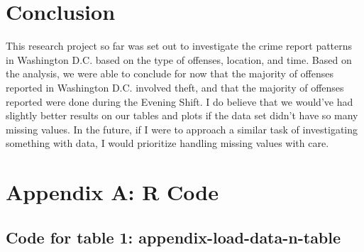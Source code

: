 \documentclass[
]{article}
\newenvironment{Shaded}{}{}
\newcommand{\AttributeTok}[1]{#1}
\newcommand{\CommentTok}[1]{\textcolor[rgb]{0.00,0.50,0.00}{#1}}
\newcommand{\ConstantTok}[1]{#1}
\newcommand{\DecValTok}[1]{#1}
\newcommand{\FunctionTok}[1]{#1}
\newcommand{\NormalTok}[1]{#1}
\newcommand{\OtherTok}[1]{\textcolor[rgb]{1.00,0.25,0.00}{#1}}
\newcommand{\SpecialCharTok}[1]{\textcolor[rgb]{0.00,0.50,0.50}{#1}}
\newcommand{\StringTok}[1]{\textcolor[rgb]{0.00,0.50,0.50}{#1}}
\begin{document}
\section{Conclusion}\label{conclusion}

This research project so far was set out to investigate the crime report
patterns in Washington D.C. based on the type of offenses, location, and
time. Based on the analysis, we were able to conclude for now that the
majority of offenses reported in Washington D.C. involved theft, and
that the majority of offenses reported were done during the Evening
Shift. I do believe that we would've had slightly better results on our
tables and plots if the data set didn't have so many missing values. In
the future, if I were to approach a similar task of investigating
something with data, I would prioritize handling missing values with
care.

\section{Appendix A: R Code}\label{appendix-a-r-code}

\subsection{Code for table 1:
appendix-load-data-n-table}\label{code-for-table-1-appendix-load-data-n-table}

\begin{Shaded}
\end{Shaded}
\end{document}
